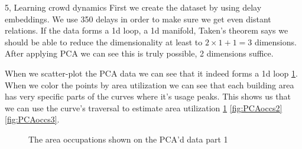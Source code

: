 \begin{task}{5, Learning crowd dynamics}
First we create the dataset by using delay embeddings. We use 350 delays in order to make sure we get even distant relations. If the data forms a 1d loop, a 1d manifold, Taken's theorem says we should be able to reduce the dimensionality at least to $2\times1+1 = 3$ dimensions. After applying PCA we can see this is truly possible, 2 dimensions suffice.

When we scatter-plot the PCA data we can see that it indeed forms a 1d loop \ref{fig:PCAoccs1}. When we color the points by area utilization we can see that each building area has very specific parts of the curves where it's usage peaks. This shows us that we can use the curve's traversal to estimate area utilization \ref{fig:PCAoccs1} \ref{fig:PCAoccs2} \ref{fig:PCAoccs3}.

\begin{figure}[H]
\centering
{}
\caption{The area occupations shown on the PCA'd data part 1}
\label{fig:PCAoccs1}
\end{figure}


\end{task}
